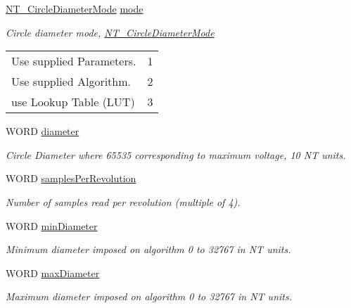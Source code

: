 \begin{DoxyCompactItemize}
\item 
\hyperlink{group___common_gaa15281053f3be4074c276b8d182c3a70}{N\+T\+\_\+\+Circle\+Diameter\+Mode} \hyperlink{struct_n_t___circle_parameters_a69022159527426d37fa672804a957aaf}{mode}
\begin{DoxyCompactList}\small\item\em Circle diameter mode, \hyperlink{group___common_gaa15281053f3be4074c276b8d182c3a70}{N\+T\+\_\+\+Circle\+Diameter\+Mode} \tabulinesep=1mm
\begin{longtabu} spread 0pt [c]{*2{|X[-1]}|}
\hline
Use supplied Parameters.&1 \\
Use supplied Algorithm.&2 \\
use Lookup Table (L\+UT)&3 \\
\end{longtabu}
\end{DoxyCompactList}\item 
W\+O\+RD \hyperlink{struct_n_t___circle_parameters_a0495f436385f97e8e465a719c6039dee}{diameter}
\begin{DoxyCompactList}\small\item\em Circle Diameter where 65535 corresponding to maximum voltage, 10 NT units. \end{DoxyCompactList}\item 
W\+O\+RD \hyperlink{struct_n_t___circle_parameters_aeb6801107a47cc762b1e1b563537d032}{samples\+Per\+Revolution}
\begin{DoxyCompactList}\small\item\em Number of samples read per revolution (multiple of 4). \end{DoxyCompactList}\item 
W\+O\+RD \hyperlink{struct_n_t___circle_parameters_a3a53a5f2b233173e08694b5ca0a2350a}{min\+Diameter}
\begin{DoxyCompactList}\small\item\em Minimum diameter imposed on algorithm 0 to 32767 in NT units. \end{DoxyCompactList}\item 
W\+O\+RD \hyperlink{struct_n_t___circle_parameters_a9b8fa455d42b75480c050da143e468e0}{max\+Diameter}
\begin{DoxyCompactList}\small\item\em Maximum diameter imposed on algorithm 0 to 32767 in NT units. \end{DoxyCompactList}\item 

\end{DoxyCompactItemize}
